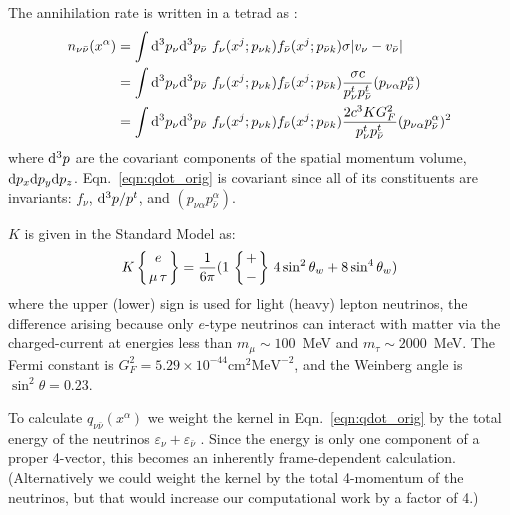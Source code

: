 The annihilation rate is written in a tetrad as \cite{good1987-nunubar}:
\begin{align}
  \label{eqn:qdot_orig}
  n_{\nu \bar{\nu}}(x^\alpha)
  &= \int \mathrm{d}^3p_{\nu} \mathrm{d}^3p_{\bar{\nu}} \,\,
  f_{\nu}(x^j;p_{\nu k})
  f_{\bar{\nu}}(x^j;p_{\bar{\nu} k})
  \sigma |v_\nu-v_{\bar{\nu}}| \nonumber \\
  &= \int \mathrm{d}^3p_\nu \mathrm{d}^3p_{\bar{\nu}} \,\,
  f_{\nu}(x^j;p_{\nu k})
  f_{\bar{\nu}}(x^j;p_{\bar{\nu} k})
  \frac{\sigma c}{p_{\nu}^t p_{\bar{\nu}}^t} (p_{\nu \alpha}  p_{\bar{\nu}}^\alpha) \nonumber \\
  &= \int \mathrm{d}^3p_{\nu} \mathrm{d}^3p_{\bar{\nu}} \,\,
  f_{\nu}(x^j;p_{\nu k})
  f_{\bar{\nu}}(x^j;p_{\bar{\nu} k})
  \frac{2 c^3 K G_F^2}{p_{\nu}^t p_{\bar{\nu}}^t}
  (p_{\nu \alpha} p_{\bar{\nu}}^\alpha)^2
\end{align}
where $\mathrm{d}^3p$ are the covariant components of the spatial momentum volume,
$\mathrm{d} p_x \mathrm{d} p_y \mathrm{d} p_z$.
Eqn.~\ref{eqn:qdot_orig} is covariant since all of its constituents are
invariants: $f_\nu$, $\mathrm{d}^3p/p^t$, and $(p_{\nu \alpha} p_{\bar{\nu}}^\alpha)$.

$K$ is given in the Standard Model as:
\begin{equation}
  K \left\{{e \atop \mu \, \tau}\right\} = \frac{1}{6\pi}
  (1 \, \left\{{+ \atop -}\right\}
  \, 4 \sin^2 \theta_w + 8 \sin^4 \theta_w) \nonumber
\end{equation}
where the upper (lower) sign is used for light (heavy) lepton neutrinos,
the difference arising because only $e$-type neutrinos can interact with
matter via the charged-current at energies less than $m_\mu\sim100$~MeV
and $m_\tau\sim2000$~MeV.
The Fermi constant is $G_F^2 = 5.29 \times 10^{-44} \text{cm}^2 \text{MeV}^{-2}$,
and the Weinberg angle is $\sin^2 \theta = 0.23$.

To calculate $q_{\nu \bar{\nu}}(x^\alpha)$ we weight the kernel in
Eqn.~\ref{eqn:qdot_orig} by the total energy of the neutrinos
$\varepsilon_{\nu} + \varepsilon_{\bar{\nu}}$
\citep{asan2000-nunubar, salm1999-nunubar}.
Since the energy is only one component of a proper 4-vector, this becomes an
inherently frame-dependent calculation.
(Alternatively we could weight the kernel by the total 4-momentum of the
neutrinos, but that would increase our computational work by a factor of 4.)

